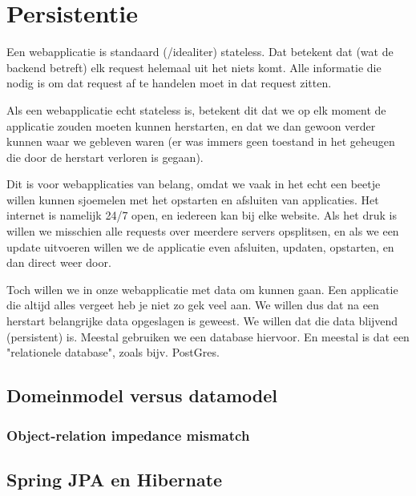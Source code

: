 \chapter{Persistentie}

Een webapplicatie is standaard (/idealiter) stateless. Dat betekent dat (wat de backend betreft) elk request helemaal
uit het niets komt. Alle informatie die nodig is om dat request af te handelen moet in dat request zitten.

Als een webapplicatie echt stateless is, betekent dit dat we op elk moment de applicatie zouden moeten
kunnen herstarten, en dat we dan gewoon verder kunnen waar we gebleven waren (er was immers geen toestand
in het geheugen die door de herstart verloren is gegaan).

Dit is voor webapplicaties van belang, omdat we vaak in het echt een beetje willen kunnen sjoemelen
met het opstarten en afsluiten van applicaties. Het internet is namelijk 24/7 open, en iedereen kan 
bij elke website. Als het druk is willen we misschien alle requests over meerdere servers opsplitsen, 
en als we een update uitvoeren willen we de applicatie even afsluiten, updaten, opstarten, en dan direct weer door.

Toch willen we in onze webapplicatie met data om kunnen gaan. Een applicatie die altijd alles vergeet 
heb je niet zo gek veel aan. We willen dus dat na een herstart belangrijke data opgeslagen is geweest.
We willen dat die data blijvend (persistent) is. Meestal gebruiken we een database hiervoor. En meestal 
is dat een "relationele database", zoals bijv. PostGres.

\section{Domeinmodel versus datamodel}



\subsection{Object-relation impedance mismatch}

\section{Spring JPA en Hibernate}
